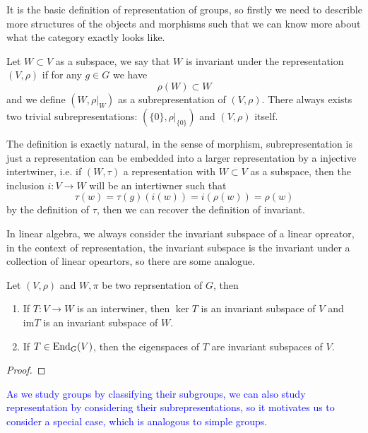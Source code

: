 It is the basic definition of representation of groups, so firstly we need to describle more structures of the objects and morphisms such that we can know more about what the category exactly looks like.

\begin{definition}
    Let \(W \subset V\) as a subspace, we say that \(W\) is invariant under the representation \((V,\rho)\) if for any \(g \in G\) we have
    \[\rho(W) \subset W\]
    and we define \((W, \rho|_{W})\) as a subrepresentation of \((V,\rho)\). There always exists two trivial subrepresentations: \((\{0\},\rho|_{\{0\}})\) and \((V,\rho)\) itself.
\end{definition}

\begin{remark}
    The definition is exactly natural, in the sense of morphism, subrepresentation is just a representation can be embedded into a larger representation by a injective intertwiner, i.e. if \((W,\tau)\) a representation with \(W \subset V\) as a subspace, then the inclusion \(i: V \to W\) will be an intertiwner such that
    \[\tau(w) = \tau(g)(i(w)) = i(\rho(w)) = \rho(w)\]
    by the definition of \(\tau\), then we can recover the definition of invariant.
\end{remark}

In linear algebra, we always consider the invariant subspace of a linear opreator, in the context of representation, the invariant subspace is the invariant under a collection of linear opeartors, so there are some analogue.

\begin{lemma}
    Let \((V,\rho)\) and \(W,\pi\) be two reprsentation of \(G\), then
    \begin{enumerate}
        \item If \(T:V \to W\) is an interwiner, then \(\ker T\) is an invariant subspace of \(V\) and \(\mathrm{im} T\) is an invariant subspace of \(W\).
        \item If \(T \in \operatorname{End}_G(V)\), then the eigenspaces of \(T\) are invariant subspaces of \(V\).
    \end{enumerate}
\end{lemma}
\begin{proof}
    
\end{proof}

\textcolor{blue}{As we study groups by classifying their subgroups, we can also study representation by considering their subrepresentations, so it motivates us to consider a special case, which is analogous to simple groups.
}

